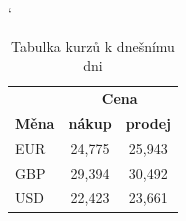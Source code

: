 \documentclass[a4paper, 11pt]{article}
\begin{document}
\begin{table}[h]
	\catcode`
	\begin{center}
	\begin{tabular}{| l | c | c |} \hline
		& \multicolumn{2}{|c|}{\textbf{Cena}} \\ \cline{2-3} 
		\textbf{Měna} 	& \textbf{nákup} 	& \textbf{prodej} \\ \hline
		EUR 			& 24,775			& 25,943 \\
		GBP 			& 29,394			& 30,492 \\
		USD 			& 22,423 			& 23,661 \\ \hline
	\end{tabular}
	\caption{Tabulka kurzů k dnešnímu dni} \label{tab1}
	\end{center}
\end{table}
\end{document}
